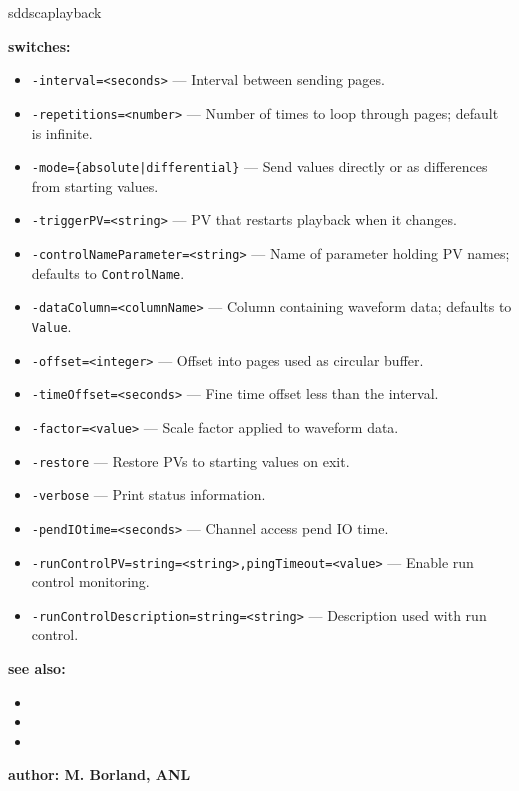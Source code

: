 \begin{sddsprog}{sddscaplayback}
\item {\bf switches:}
  \begin{itemize}
  \item {\tt -interval=<seconds>} --- Interval between sending pages.
  \item {\tt -repetitions=<number>} --- Number of times to loop through pages; default is infinite.
  \item {\tt -mode=\{absolute|differential\}} --- Send values directly or as differences from starting values.
  \item {\tt -triggerPV=<string>} --- PV that restarts playback when it changes.
  \item {\tt -controlNameParameter=<string>} --- Name of parameter holding PV names; defaults to {\tt ControlName}.
  \item {\tt -dataColumn=<columnName>} --- Column containing waveform data; defaults to {\tt Value}.
  \item {\tt -offset=<integer>} --- Offset into pages used as circular buffer.
  \item {\tt -timeOffset=<seconds>} --- Fine time offset less than the interval.
  \item {\tt -factor=<value>} --- Scale factor applied to waveform data.
  \item {\tt -restore} --- Restore PVs to starting values on exit.
  \item {\tt -verbose} --- Print status information.
  \item {\tt -pendIOtime=<seconds>} --- Channel access pend IO time.
  \item {\tt -runControlPV=string=<string>,pingTimeout=<value>} --- Enable run control monitoring.
  \item {\tt -runControlDescription=string=<string>} --- Description used with run control.
  \end{itemize}

\item {\bf see also:}
  \begin{itemize}
  \item {}
  \item {}
  \item {}
  \end{itemize}

\item {\bf author: M. Borland, ANL}
\end{sddsprog}
